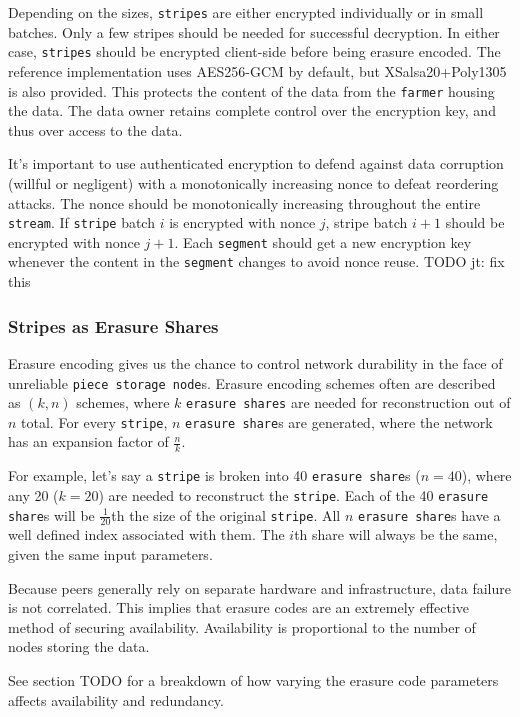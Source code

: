 \documentclass[a4paper,10pt]{article} \usepackage[utf8]{inputenc}
\newcommand{\x}[1]{{\tt #1}} \newcommand{\code}[1]{{\tt #1}}
\newcommand{\todo}[1]{{\color{red} TODO #1 }}
\begin{document}
Depending on the sizes, \x{stripes} are either encrypted individually or in
small batches. Only a few stripes should be needed for successful
decryption. In either case, \x{stripes} should be encrypted client-side before
being erasure encoded. The reference implementation uses AES256-GCM by default,
but XSalsa20+Poly1305 is also provided. This protects the
content of the data from the \x{farmer} housing the data. The data owner
retains complete control over the encryption key, and thus over access to the
data.

It's important to use authenticated encryption to defend against data corruption
(willful or negligent) with a monotonically increasing nonce to defeat
reordering attacks. The nonce should be monotonically increasing throughout
the entire \x{stream}. If \x{stripe} batch $i$ is encrypted
with nonce $j$, stripe batch $i+1$ should be encrypted with nonce $j+1$. Each
\x{segment} should get a new encryption key whenever the content in the
\x{segment} changes to avoid nonce reuse. \todo{jt: fix this}

\subsubsection{Stripes as Erasure Shares}

Erasure encoding gives us the chance to control network durability in the face
of unreliable \x{piece storage node}s. Erasure encoding schemes often are
described as $(k, n)$ schemes, where $k$ \x{erasure shares} are needed for
reconstruction out of $n$ total. For every \x{stripe}, $n$ \x{erasure share}s
are generated, where the network has an expansion factor of $\frac{n}{k}$.

For example, let's say a \x{stripe} is broken into 40 \x{erasure share}s
($n=40$), where any 20 ($k=20$) are needed to reconstruct the \x{stripe}. Each
of the 40 \x{erasure share}s will be $\frac{1}{20}$th the size of the original
\x{stripe}. All $n$ \x{erasure share}s have a well defined index associated
with them. The $i$th share will always be the same, given the same input
parameters.

Because peers generally rely on separate hardware and infrastructure, data
failure is not correlated. This implies that erasure codes are an extremely
effective method of securing availability. Availability is proportional to the
number of nodes storing the data.

See section \todo{} for a breakdown of how varying the erasure code parameters
affects availability and redundancy.
\end{document}
